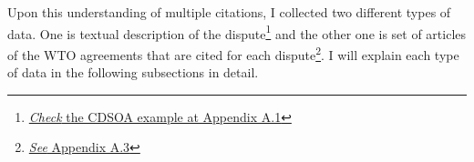 Upon this understanding of multiple citations,
I collected two different types of data. %
One is textual description of the dispute\footnote{\hyperref[sub:factual-aspect-example]{\textit{Check} the CDSOA example at Appendix A.1}} and the other one is
set of articles of the WTO agreements that are
cited for each dispute\footnote{\hyperref[sub:cited-articles-table]{\textit{See} Appendix A.3}}.
I will explain each type of data in the following subsections in detail.


 

 
 

